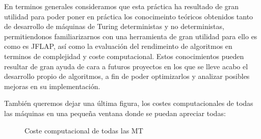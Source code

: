 En terminos generales consideramos que esta práctica ha resultado de gran utilidad para poder poner en práctica los conocimeinto teóricos obtenidos tanto de desarrollo de máquinas de Turing deterministas y no deterministas, permitiendonos familiarizarnos con una herramienta de gran utilidad para ello es como es JFLAP, así como la evaluación del rendimeinto de algoritmos en terminos de complejidad y coste computacional.
Estos conocimientos pueden resultar de gran ayuda de cara a futuros proyectos en los que se lleve acabo el desarrollo propio de algoritmos, a fin de poder optimizarlos y analizar posibles mejoras en su implementación.

\vfill

También queremos dejar una última figura, los costes computacionales de todas las máquinas en una pequeña ventana donde se puedan apreciar todas:
\begin{figure}[H]
  \centering
  
  \caption{Coste computacional de todas las MT}
\end{figure}
